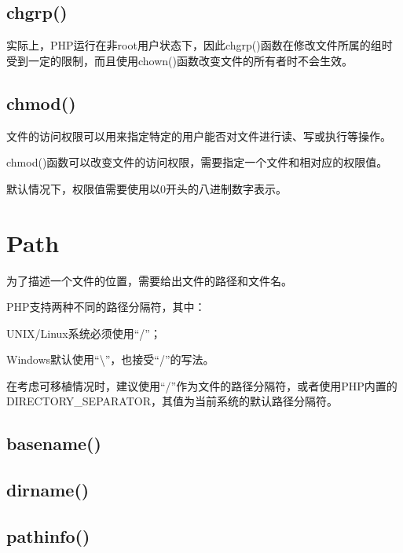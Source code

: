 \subsection{chgrp()}



实际上，PHP运行在非root用户状态下，因此chgrp()函数在修改文件所属的组时受到一定的限制，而且使用chown()函数改变文件的所有者时不会生效。


\subsection{chmod()}


文件的访问权限可以用来指定特定的用户能否对文件进行读、写或执行等操作。

chmod()函数可以改变文件的访问权限，需要指定一个文件和相对应的权限值。

默认情况下，权限值需要使用以0开头的八进制数字表示。




\section{Path}


为了描述一个文件的位置，需要给出文件的路径和文件名。


PHP支持两种不同的路径分隔符，其中：

\begin{compactitem}
 \item UNIX/Linux系统必须使用“/”；
 \item Windows默认使用“\textbackslash ”，也接受“/”的写法。
\end{compactitem}

在考虑可移植情况时，建议使用“/”作为文件的路径分隔符，或者使用PHP内置的DIRECTORY\_SEPARATOR，其值为当前系统的默认路径分隔符。




\subsection{basename()}



\subsection{dirname()}



\subsection{pathinfo()}

